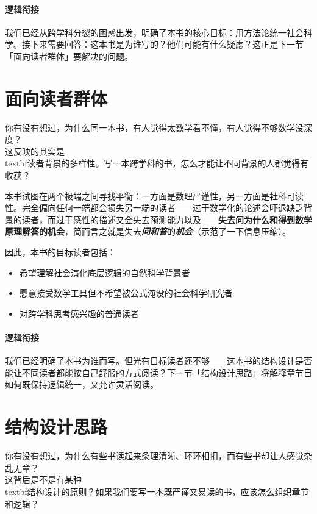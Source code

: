 \documentclass[openany, a4paper, 12pt]{book}
\begin{document}
	\paragraph*{逻辑衔接}
	我们已经从跨学科分裂的困惑出发，明确了本书的核心目标：用方法论统一社会科学。接下来需要回答：这本书是为谁写的？他们可能有什么疑虑？这正是下一节「面向读者群体」要解决的问题。
	
	\section{面向读者群体}

	\begin{readingnote}
		你有没有想过，为什么同一本书，有人觉得太数学看不懂，有人觉得不够数学没深度？\\
		这反映的其实是\\textbf{读者背景的多样性}。写一本跨学科的书，怎么才能让不同背景的人都觉得有收获？
	\end{readingnote}

本书试图在两个极端之间寻找平衡：一方面是数理严谨性，另一方面是社科可读性。完全偏向任何一端都会损失另一端的读者——过于数学化的论述会吓退缺乏背景的读者，而过于感性的描述又会失去预测能力以及——\textbf{失去问为什么和得到数学原理解答的机会}，简而言之就是失去{\large \emph{\textbf{问和答}}}的\textbf{\emph{机会}}（示范了一下信息压缩）。

	因此，本书的目标读者包括：
	\begin{itemize}
		\item 希望理解社会演化底层逻辑的自然科学背景者
		\item 愿意接受数学工具但不希望被公式淹没的社会科学研究者
		\item 对跨学科思考感兴趣的普通读者
	\end{itemize}

	\paragraph*{逻辑衔接}
	我们已经明确了本书为谁而写。但光有目标读者还不够——这本书的结构设计是否能让不同读者都能按自己舒服的方式阅读？下一节「结构设计思路」将解释章节目如何既保持逻辑统一，又允许灵活阅读。

	\section{结构设计思路}

	\begin{readingnote}
		你有没有想过，为什么有些书读起来条理清晰、环环相扣，而有些书却让人感觉杂乱无章？\\
		这背后是不是有某种\\textbf{结构设计的原则}？如果我们要写一本既严谨又易读的书，应该怎么组织章节和逻辑？
	\end{readingnote}
\end{document}
